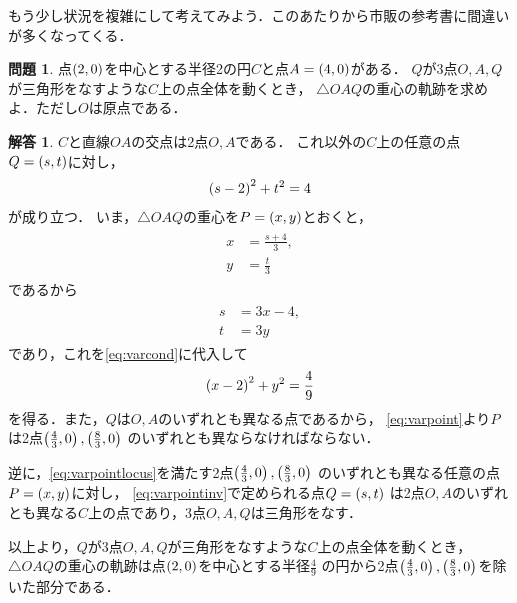 \documentclass[11pt,a4paper]{ltjsarticle}
\newcommand*{\coord}[1]{\paren{#1}}
\theoremstyle{definition}
\newtheorem{que}[dfn]{問題}
\newtheorem{ans}[dfn]{解答}
\begin{document}
もう少し状況を複雑にして考えてみよう．このあたりから市販の参考書に間違いが多くなってくる．

\begin{que} \label{que:varpoint}
  点$\coord{2,0}$を中心とする半径2の円$C$と点$A = \coord{4,0}$がある．
  $Q$が3点$O,A,Q$が三角形をなすような$C$上の点全体を動くとき，
  $\triangle OAQ$の重心の軌跡を求めよ．ただし$O$は原点である．
\end{que}

\begin{ans} \label{ans:varpoint}
  $C$と直線$OA$の交点は2点$O, A$である．
  これ以外の$C$上の任意の点$Q = \coord{s, t}$に対し，
  \begin{align}
    \paren{s - 2}^2 + t^2 = 4
    \label{eq:varcond}
  \end{align}
  が成り立つ．
  いま，$\triangle OAQ$の重心を$P = \coord{x, y}$とおくと，
  \begin{align}
    \begin{aligned}
      x & = \frac{s + 4}{3}, \\
      y & = \frac{t}{3}
    \end{aligned}
    \label{eq:varpoint}
  \end{align}
  であるから
  \begin{align}
    \begin{aligned}
      s & = 3x - 4, \\
      t & = 3y
    \end{aligned}
    \label{eq:varpointinv}
  \end{align}
  であり，これを\cref{eq:varcond}に代入して
  \begin{align}
    \paren{x - 2}^2 + y^2 = \frac{4}{9}
    \label{eq:varpointlocus}
  \end{align}
  を得る．また，$Q$は$O,A$のいずれとも異なる点であるから，
  \cref{eq:varpoint}より$P$は2点$\coord{\frac{4}{3}, 0}, \coord{\frac{8}{3}, 0}$
  のいずれとも異ならなければならない．

  逆に，\cref{eq:varpointlocus}を満たす2点$\coord{\frac{4}{3}, 0}, \coord{\frac{8}{3}, 0}$
  のいずれとも異なる任意の点$P = \coord{x,y}$に対し，
  \cref{eq:varpointinv}で定められる点$Q = \coord{s, t}$
  は2点$O, A$のいずれとも異なる$C$上の点であり，3点$O,A,Q$は三角形をなす．

  以上より，$Q$が3点$O,A,Q$が三角形をなすような$C$上の点全体を動くとき，
  $\triangle OAQ$の重心の軌跡は点$\coord{2, 0}$を中心とする半径$\frac{4}{9}$
  の円から2点$\coord{\frac{4}{3}, 0}, \coord{\frac{8}{3}, 0}$を除いた部分である．
\end{ans}
\end{document}
